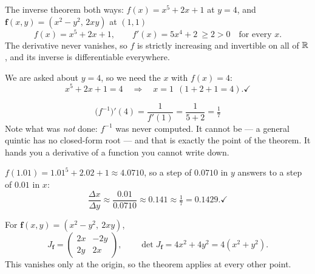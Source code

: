 \begin{worked}{The inverse theorem both ways: $f(x)=x^{5}+2x+1$ at $y=4$, and $\mathbf{f}(x,y)=(x^{2}-y^{2},\,2xy)$ at $(1,1)$}
\[
  f(x)=x^{5}+2x+1,
  \qquad
  f'(x)=5x^{4}+2\ \ge 2>0\quad\text{for every }x .
\]
The derivative never vanishes, so $f$ is strictly increasing and invertible
on all of $\mathbb{R}$, and its inverse is differentiable everywhere.

We are asked about $y=4$, so we need the $x$ with $f(x)=4$:
\[
  x^{5}+2x+1=4
  \quad\Longrightarrow\quad
  x=1\ \ (1+2+1=4). \checkmark
\]

\[
  \bigl(f^{-1}\bigr)'(4)=\frac{1}{f'(1)}=\frac{1}{5+2}=\boxed{\tfrac17}
\]
Note what was \emph{not} done: $f^{-1}$ was never computed. It cannot be ---
a general quintic has no closed-form root --- and that is exactly the point
of the theorem. It hands you a derivative of a function you cannot write
down.

$f(1.01)=1.01^{5}+2.02+1\approx4.0710$, so a step of $0.0710$ in $y$ answers
to a step of $0.01$ in $x$:
\[
  \frac{\Delta x}{\Delta y}\approx\frac{0.01}{0.0710}\approx0.141
  \approx\tfrac17=0.1429 . \checkmark
\]

For $\mathbf{f}(x,y)=(x^{2}-y^{2},\ 2xy)$,
\[
  J_{\mathbf{f}}=\begin{pmatrix}2x&-2y\\ 2y&2x\end{pmatrix},
  \qquad
  \det J_{\mathbf{f}}=4x^{2}+4y^{2}=4(x^{2}+y^{2}).
\]
This vanishes only at the origin, so the theorem applies at every other
point.


\end{worked}
